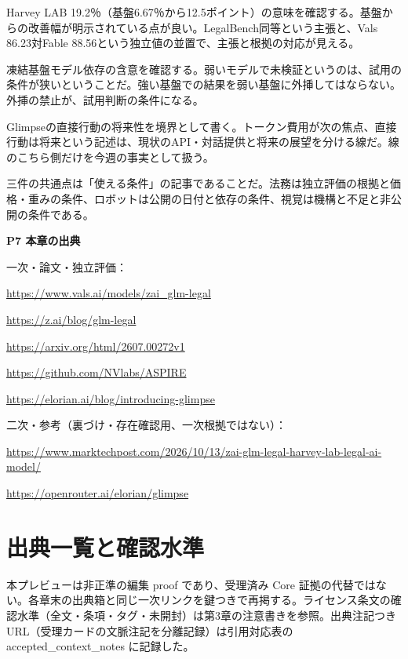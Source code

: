 \documentclass[lualatex,a4paper,10pt]{jlreq}
\begin{document}
Harvey LAB 19.2％（基盤6.67％から12.5ポイント）の意味を確認する。基盤からの改善幅が明示されている点が良い。LegalBench同等という主張と、Vals 86.23対Fable 88.56という独立値の並置で、主張と根拠の対応が見える。
\cite{B53,B54,B55}


凍結基盤モデル依存の含意を確認する。弱いモデルで未検証というのは、試用の条件が狭いということだ。強い基盤での結果を弱い基盤に外挿してはならない。外挿の禁止が、試用判断の条件になる。
\cite{B56,B57}


Glimpseの直接行動の将来性を境界として書く。トークン費用が次の焦点、直接行動は将来という記述は、現状のAPI・対話提供と将来の展望を分ける線だ。線のこちら側だけを今週の事実として扱う。
\cite{B58,B59}


三件の共通点は「使える条件」の記事であることだ。法務は独立評価の根拠と価格・重みの条件、ロボットは公開の日付と依存の条件、視覚は機構と不足と非公開の条件である。
\cite{B56,B58,B57,B59,B53,B54,B55}


\begin{tcolorbox}[colback=white,colframe=SurveyRule,arc=1mm,boxrule=0.4pt,left=2mm,right=2mm]
\textbf{P7 本章の出典}\par\footnotesize
一次・論文・独立評価：\par
[B54] \url{https://www.vals.ai/models/zai_glm-legal}\par
[B55] \url{https://z.ai/blog/glm-legal}\par
[B56] \url{https://arxiv.org/html/2607.00272v1}\par
[B57] \url{https://github.com/NVlabs/ASPIRE}\par
[B58] \url{https://elorian.ai/blog/introducing-glimpse}\par
二次・参考（裏づけ・存在確認用、一次根拠ではない）：\par
[B53] \url{https://www.marktechpost.com/2026/10/13/zai-glm-legal-harvey-lab-legal-ai-model/}\par
[B59] \url{https://openrouter.ai/elorian/glimpse}\par
\end{tcolorbox}

\onecolumn
\section*{出典一覧と確認水準}
本プレビューは非正準の編集 proof であり、受理済み Core 証拠の代替ではない。各章末の出典箱と同じ一次リンクを鍵つきで再掲する。ライセンス条文の確認水準（全文・条項・タグ・未開封）は第3章の注意書きを参照。出典注記つきURL（受理カードの文脈注記を分離記録）は引用対応表の accepted\_context\_notes に記録した。
\end{document}
